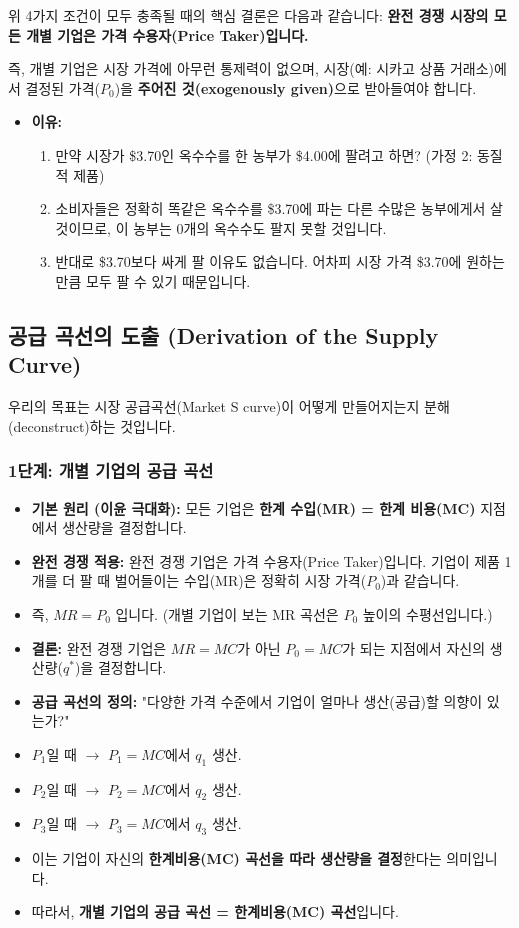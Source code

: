 \documentclass[11pt,a4paper]{book}
\theoremstyle{definition}
\begin{document}
위 4가지 조건이 모두 충족될 때의 핵심 결론은 다음과 같습니다:
\textbf{완전 경쟁 시장의 모든 개별 기업은 가격 수용자(Price Taker)입니다.}

즉, 개별 기업은 시장 가격에 아무런 통제력이 없으며, 시장(예: 시카고 상품 거래소)에서 결정된 가격($P_0$)을 \textbf{주어진 것(exogenously given)}으로 받아들여야 합니다.

\begin{itemize}
    \item \textbf{이유:}
    \begin{enumerate}
        \item 만약 시장가 \$3.70인 옥수수를 한 농부가 \$4.00에 팔려고 하면? (가정 2: 동질적 제품)
        \item 소비자들은 정확히 똑같은 옥수수를 \$3.70에 파는 다른 수많은 농부에게서 살 것이므로, 이 농부는 0개의 옥수수도 팔지 못할 것입니다.
        \item 반대로 \$3.70보다 싸게 팔 이유도 없습니다. 어차피 시장 가격 \$3.70에 원하는 만큼 모두 팔 수 있기 때문입니다.
    \end{enumerate}
\end{itemize}

\subsection{공급 곡선의 도출 (Derivation of the Supply Curve)}

우리의 목표는 시장 공급곡선(Market S curve)이 어떻게 만들어지는지 분해(deconstruct)하는 것입니다.

\subsubsection{1단계: 개별 기업의 공급 곡선}

\begin{itemize}
    \item \textbf{기본 원리 (이윤 극대화):} 모든 기업은 \textbf{한계 수입(MR) = 한계 비용(MC)} 지점에서 생산량을 결정합니다.
    \item \textbf{완전 경쟁 적용:} 완전 경쟁 기업은 가격 수용자(Price Taker)입니다. 기업이 제품 1개를 더 팔 때 벌어들이는 수입(MR)은 정확히 시장 가격($P_0$)과 같습니다.
    \item 즉, $MR = P_0$ 입니다. (개별 기업이 보는 MR 곡선은 $P_0$ 높이의 수평선입니다.)
    \item \textbf{결론:} 완전 경쟁 기업은 $MR = MC$가 아닌 \textbf{$P_0 = MC$}가 되는 지점에서 자신의 생산량($q^*$)을 결정합니다.
    \item \textbf{공급 곡선의 정의:} "다양한 가격 수준에서 기업이 얼마나 생산(공급)할 의향이 있는가?"
    \item $P_1$일 때 $\to$ $P_1 = MC$에서 $q_1$ 생산.
    \item $P_2$일 때 $\to$ $P_2 = MC$에서 $q_2$ 생산.
    \item $P_3$일 때 $\to$ $P_3 = MC$에서 $q_3$ 생산.
    \item 이는 기업이 자신의 \textbf{한계비용(MC) 곡선을 따라 생산량을 결정}한다는 의미입니다.
    \item 따라서, \textbf{개별 기업의 공급 곡선 = 한계비용(MC) 곡선}입니다.
\end{itemize}
\end{document}
